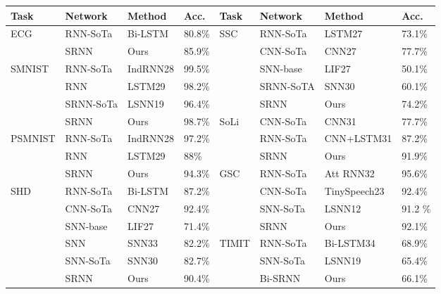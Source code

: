 \begin{tabular}{llllllll}
\toprule
Task & Network & Method & Acc. & Task & Network & Method & Acc. \\
\midrule
ECG & RNN-SoTa & Bi-LSTM & 80.8\% & SSC & RNN-SoTa & LSTM27 & 73.1\% \\
 & SRNN & Ours & 85.9\% &  & CNN-SoTa & CNN27 & 77.7\% \\
SMNIST & RNN-SoTa & IndRNN28 & 99.5\% &  & SNN-base & LIF27 & 50.1\% \\
 & RNN & LSTM29 & 98.2\% &  & SRNN-SoTA & SNN30 & 60.1\% \\
 & SRNN-SoTa & LSNN19 & 96.4\% &  & SRNN & Ours & 74.2\% \\
 & SRNN & Ours & 98.7\% & SoLi & CNN-SoTa & CNN31 & 77.7\% \\
PSMNIST & RNN-SoTa & IndRNN28 & 97.2\% &  & RNN-SoTa & CNN+LSTM31 & 87.2\% \\
 & RNN & LSTM29 & 88\% &  & SRNN & Ours & 91.9\% \\
 & SRNN & Ours & 94.3\% & GSC & RNN-SoTa & Att RNN32 & 95.6\% \\
SHD & RNN-SoTa & Bi-LSTM & 87.2\% &  & CNN-SoTa & TinySpeech23 & 92.4\% \\
 & CNN-SoTa & CNN27 & 92.4\% &  & SNN-SoTa & LSNN12 & 91.2 \% \\
 & SNN-base & LIF27 & 71.4\% &  & SRNN & Ours & 92.1\% \\
 & SNN & SNN33 & 82.2\% & TIMIT & RNN-SoTa & Bi-LSTM34 & 68.9\% \\
 & SNN-SoTa & SNN30 & 82.7\% &  & SNN-SoTa & LSNN19 & 65.4\% \\
 & SRNN & Ours & 90.4\% &  & Bi-SRNN & Ours & 66.1\% \\
\bottomrule
\end{tabular}
